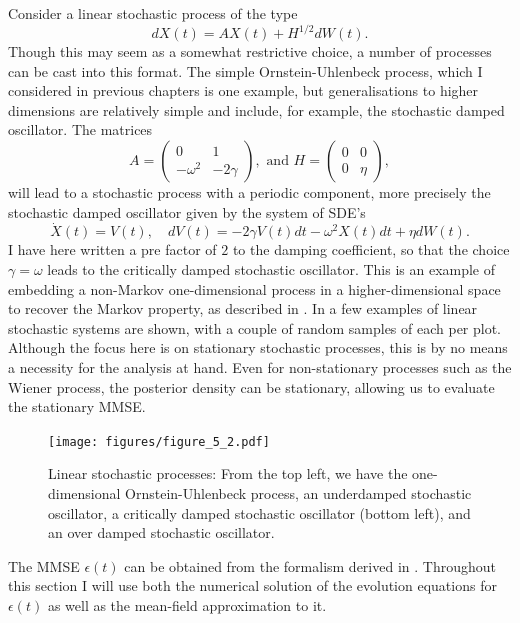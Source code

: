 Consider a linear stochastic process of the type
\[
dX(t) = AX(t) + H^{1/2} dW(t).
\]
Though this may seem as a somewhat restrictive choice, a number of processes can be cast into this format. The simple Ornstein-Uhlenbeck process, which I considered in
previous chapters is one example, but generalisations to higher dimensions are relatively simple and include, for example, the stochastic damped oscillator. The matrices
\[
A= \left(\begin{array}{cc} 0 & 1\\ -\omega^2&-2 \gamma\end{array}\right), \textrm{ and }H= \left(\begin{array}{cc} 0 & 0\\ 0& \eta \end{array}\right),
\]
will lead to a stochastic process with a periodic component, more precisely the stochastic damped oscillator given by the system of SDE's
\[
\dot{X}(t) = V(t), \quad dV(t) = -2 \gamma V(t)dt -\omega^2 X(t) dt + \eta dW(t). 
\]
I have here written a pre factor of $2$ to the damping coefficient, so that the choice $\gamma = \omega$ leads to the critically damped stochastic oscillator.
This is an example of embedding a non-Markov one-dimensional process in a higher-dimensional space to recover the Markov property, as described in .
In  a few examples of linear stochastic systems are shown, with a couple of 
random samples of each per plot. Although the focus here is on stationary stochastic processes,
this is by no means a necessity for the analysis at hand. Even for non-stationary processes such as the Wiener process, the posterior density can be stationary, allowing us to evaluate the stationary MMSE.\par

\begin{figure}
\label{fig:stoch_example}
\texttt{[image: figures/figure\_5\_2.pdf]}
\caption[Samples of linear stochastic processes.]{Linear stochastic processes: From the top left, we have the one-dimensional Ornstein-Uhlenbeck process, an underdamped stochastic oscillator,
a critically damped stochastic oscillator (bottom left), and an over damped stochastic oscillator.}
\end{figure}


The MMSE $\epsilon(t)$ can be obtained from the formalism derived in . Throughout this section I will use both the numerical solution of the
evolution equations for $\epsilon(t)$ as well as the mean-field approximation to it.\par

